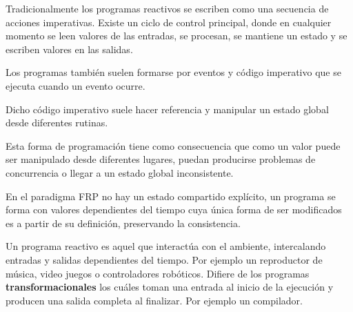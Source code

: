 
Tradicionalmente los programas reactivos
se escriben como una secuencia de acciones imperativas.
Existe un ciclo de control principal, donde en cualquier
momento se leen valores de las entradas, se procesan,
se mantiene un estado y se escriben valores en las salidas.

Los programas también suelen formarse por eventos
y código imperativo que se ejecuta cuando un evento ocurre.

Dicho código imperativo suele hacer referencia y manipular
un estado global desde diferentes rutinas.

Esta forma de programación tiene como consecuencia que
como un valor puede ser manipulado desde diferentes lugares,
puedan producirse problemas de concurrencia o llegar a un
estado global inconsistente.

En el paradigma FRP no hay un estado compartido explícito,
un programa se forma con valores dependientes del tiempo
cuya única forma de ser modificados
es a partir de su definición, preservando la consistencia.

  Un programa reactivo es aquel que interactúa con el ambiente,
intercalando entradas y salidas dependientes del tiempo.
  Por ejemplo un reproductor de música, video juegos o
controladores robóticos.
  Difiere de los programas \textbf{transformacionales} los cuáles
toman una entrada al inicio de la ejecución y producen una salida
completa al finalizar. Por ejemplo un compilador.

